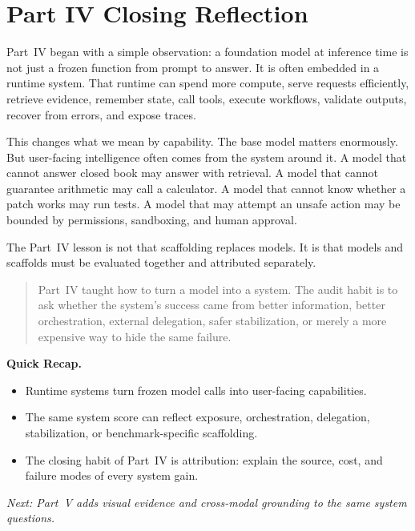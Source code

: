 \section{Part IV Closing Reflection}
\label{sec:ch22-closing-reflection}

Part~IV began with a simple observation: a foundation model at inference time is not just a frozen function from prompt to answer. It is often embedded in a runtime system. That runtime can spend more compute, serve requests efficiently, retrieve evidence, remember state, call tools, execute workflows, validate outputs, recover from errors, and expose traces.

This changes what we mean by capability. The base model matters enormously. But user-facing intelligence often comes from the system around it. A model that cannot answer closed book may answer with retrieval. A model that cannot guarantee arithmetic may call a calculator. A model that cannot know whether a patch works may run tests. A model that may attempt an unsafe action may be bounded by permissions, sandboxing, and human approval.

The Part~IV lesson is not that scaffolding replaces models. It is that models and scaffolds must be evaluated together and attributed separately.

\begin{quote}
Part~IV taught how to turn a model into a system. The audit habit is to ask whether the system's success came from better information, better orchestration, external delegation, safer stabilization, or merely a more expensive way to hide the same failure.
\end{quote}

\begin{quickrecap}
\textbf{Quick Recap.}
\begin{itemize}[nosep,leftmargin=1.5em]
  \item Runtime systems turn frozen model calls into user-facing capabilities.
  \item The same system score can reflect exposure, orchestration, delegation, stabilization, or benchmark-specific scaffolding.
  \item The closing habit of Part~IV is attribution: explain the source, cost, and failure modes of every system gain.
\end{itemize}
\textit{Next: Part~V adds visual evidence and cross-modal grounding to the same system questions.}
\end{quickrecap}


